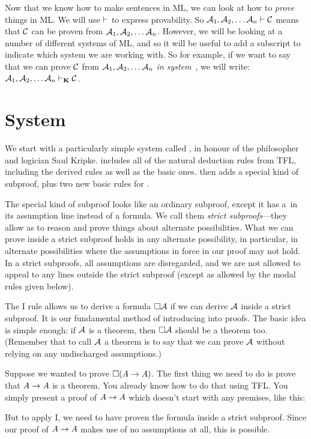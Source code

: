 Now that we know how to make sentences in ML, we can look at how to \emph{prove} things in ML. We will use $\vdash$ to express provability.  So $\mathcal{A}_1,\mathcal{A}_2, \dots \mathcal{A}_n \vdash \mathcal{C}$ means that $\mathcal{C}$ can be proven from $\mathcal{A}_1,\mathcal{A}_2, \dots \mathcal{A}_n$. However, we will be looking at a number of different systems of ML, and so it will be useful to add a subscript to indicate which system we are working with. So for example, if we want to say that we can prove $\mathcal{C}$ from $\mathcal{A}_1,\mathcal{A}_2, \dots \mathcal{A}_n$ \emph{in system}~\mlK, we will write: $\mathcal{A}_1,\mathcal{A}_2, \dots \mathcal{A}_n \vdash_{\mathbf{K}} \mathcal{C}$.

\section{System \mlK}
\label{K}

We start with a particularly simple system called \mlK, in honour of the philosopher and logician Saul Kripke. \mlK{} includes all of the natural deduction rules from TFL, including the derived rules as well as the basic ones. \mlK{} then adds a special kind of subproof, plus two new basic rules for \ebox.

The special kind of subproof looks like an ordinary subproof, except it has a~\ebox in its assumption line instead of a formula. We call them \emph{strict subproofs}---they allow as to reason and prove things about alternate possibilities. What we can prove inside a strict subproof holds in any alternate possibility, in particular, in alternate possibilities where the assumptions in force in our proof may not hold. In a strict subproofs, all assumptions are disregarded, and we are not allowed to appeal to any lines outside the strict subproof (except as allowed by the modal rules given below).

The \ebox I rule allows us to derive a formula $\Box \mathcal{A}$ if we can derive $\mathcal{A}$ inside a strict subproof.  It is our fundamental method of introducing \ebox{} into proofs. The basic idea is simple enough: if $\mathcal{A}$ is a theorem, then $\Box \mathcal{A}$ should be a theorem too. (Remember that to call $\mathcal{A}$ a theorem is to say that we can prove $\mathcal{A}$ without relying on any undischarged assumptions.)

Suppose we wanted to prove $\Box(A\rightarrow A)$. The first thing we need to do is prove that $A\rightarrow A$ is a theorem. You already know how to do that using TFL. You simply present a proof of $A\rightarrow A$ which doesn't start with any premises, like this:
\begin{fitchproof}
		\open
		\AS
		\close
\end{fitchproof}
But to apply \ebox I, we need to have proven the formula inside a strict subproof.  Since our proof of $A \rightarrow A$ makes use of no assumptions at all, this is possible.
\begin{fitchproof}
		\open
		\AS
		\open
		\AS
		\close
		\close
\end{fitchproof}


